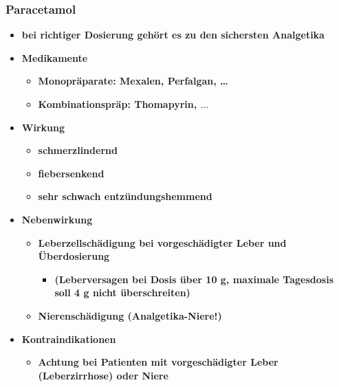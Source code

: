 \subsubsection{Paracetamol}
	\begin{itemize}
		\item \textbf{bei richtiger Dosierung gehört es zu den sichersten Analgetika}
		\item \textbf{Medikamente}
			\begin{itemize}
				\item \textbf{Monopräparate: Mexalen\textregistered, Perfalgan\textregistered, …}
				\item \textbf{Kombinationspräp: Thomapyrin\textregistered, $\dots$}
			\end{itemize}
		\item \textbf{Wirkung}
			\begin{itemize}
				\item \textbf{schmerzlindernd}
				\item \textbf{fiebersenkend}
				\item \textbf{sehr schwach entzündungshemmend}
			\end{itemize}
		\item \textbf{Nebenwirkung}
			\begin{itemize}
				\item \textbf{Leberzellschädigung bei vorgeschädigter Leber und Überdosierung}
					\begin{itemize}
						\item \textbf{(Leberversagen bei Dosis über 10 g, maximale Tagesdosis soll 4 g nicht überschreiten)}
					\end{itemize}
				\item \textbf{Nierenschädigung (Analgetika-Niere!)}
			\end{itemize}
		\item \textbf{Kontraindikationen}
			\begin{itemize}
				\item \textbf{Achtung bei Patienten mit vorgeschädigter Leber (Leberzirrhose) oder Niere}
			\end{itemize}
	\end{itemize}
				
